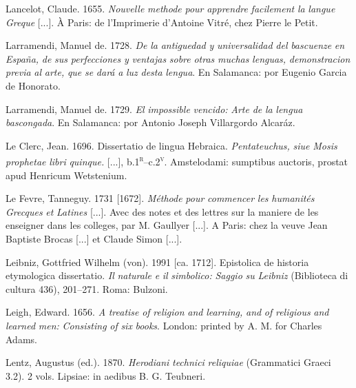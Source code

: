 \documentclass[output=paper]{langsci/langscibook}
\begin{document}
Lancelot, Claude. 1655. \textit{Nouvelle} \textit{methode} \textit{pour} \textit{apprendre} \textit{facilement} \textit{la} \textit{langue} \textit{Greque} [...]. À Paris: de l’Imprimerie d’Antoine Vitré, chez Pierre le Petit.

Larramendi, Manuel de. 1728. \textit{De} \textit{la} \textit{antiguedad} \textit{y} \textit{universalidad} \textit{del} \textit{bascuenze} \textit{en} \textit{España,} \textit{de} \textit{sus} \textit{perfecciones} \textit{y} \textit{ventajas} \textit{sobre} \textit{otras} \textit{muchas} \textit{lenguas,} \textit{demonstracion} \textit{previa} \textit{al} \textit{arte,} \textit{que} \textit{se} \textit{dará} \textit{a} \textit{luz} \textit{desta} \textit{lengua}. En Salamanca: por Eugenio Garcia de Honorato.

Larramendi, Manuel de. 1729. \textit{El} \textit{impossible} \textit{vencido:} \textit{Arte} \textit{de} \textit{la} \textit{lengua} \textit{bascongada}. En Salamanca: por Antonio Joseph Villargordo Alcaráz.

Le Clerc, Jean. 1696. Dissertatio de lingua Hebraica. \textit{Pentateuchus,} \textit{siue} \textit{Mosis} \textit{prophetae} \textit{libri} \textit{quinque.} [...], b.1\textsc{\textsuperscript{r}}–c.2\textsc{\textsuperscript{v}}. Amstelodami: sumptibus auctoris, prostat apud Henricum Wetstenium.

Le Fevre, Tanneguy. 1731 [1672]. \textit{Méthode} \textit{pour} \textit{commencer} \textit{les} \textit{humanités} \textit{Grecques} \textit{et} \textit{Latines} [...]. Avec des notes et des lettres sur la maniere de les enseigner dans les colleges, par M. Gaullyer [...]. A Paris: chez la veuve Jean Baptiste Brocas [...] et Claude Simon [...].

Leibniz, Gottfried Wilhelm (von). 1991 [ca. 1712]. Epistolica de historia etymologica dissertatio. \textit{Il} \textit{naturale} \textit{e} \textit{il} \textit{simbolico:} \textit{Saggio} \textit{su} \textit{Leibniz} (Biblioteca di cultura 436), 201–271. Roma: Bulzoni.

Leigh, Edward. 1656. \textit{A} \textit{treatise} \textit{of} \textit{religion} \textit{and} \textit{learning,} \textit{and} \textit{of} \textit{religious} \textit{and} \textit{learned} \textit{men:} \textit{Consisting} \textit{of} \textit{six} \textit{books}. London: printed by A. M. for Charles Adams.

Lentz, Augustus (ed.). 1870. \textit{Herodiani} \textit{technici} \textit{reliquiae} (Grammatici Graeci 3.2). 2 vols. Lipsiae: in aedibus B. G. Teubneri.
\end{document}
